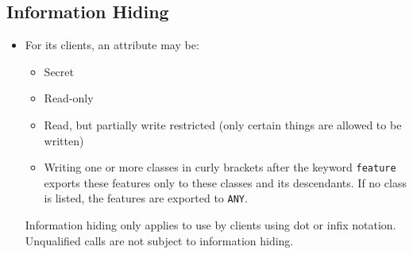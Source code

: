 \documentclass[a4paper]{article}
\newcommand{\inline}[1]{\lstinline!#1!}%
\begin{document}
\subsection{Information Hiding}
\begin{itemize}
\item For its clients, an attribute may be:
\begin{itemize}
\item Secret
\item Read-only
\item Read, but partially write restricted (only certain things are allowed to be written)
\item Writing one or more classes in curly brackets after the keyword \inline{feature} exports these 
features only to these classes and its descendants. If no class is listed, the features 
are exported to \inline{ANY}. 
\end{itemize}
Information hiding only applies to use by clients using dot or infix notation. Unqualified calls are not subject to information hiding. 
\end{itemize}
\end{document}
